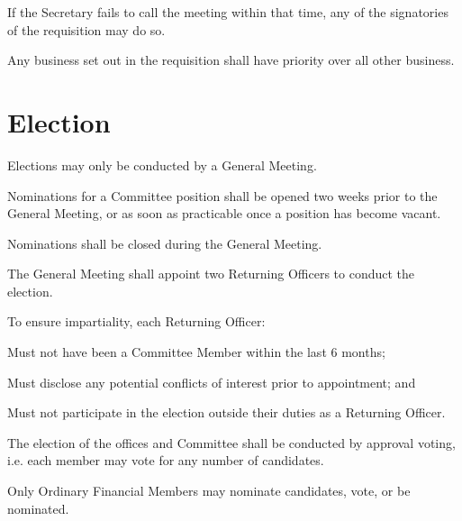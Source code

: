 \documentclass[a4paper]{article}
\begin{document}
\begin{myEnumerate}
\begin{myEnumerate}
            \begin{myEnumerate}
                \item If the Secretary fails to call the meeting within that time, any of the signatories of the requisition may do so.
            \end{myEnumerate}
            \item \label{item:sgm_priority} Any business set out in the requisition shall have priority over all other business.
        \end{myEnumerate}
\end{myEnumerate}


\section{Election} \label{sec:elections}
\begin{myEnumerate}
    \item Elections may only be conducted by a General Meeting.
    \item Nominations for a Committee position shall be opened two weeks prior to the General Meeting, or as soon as practicable once a position has become vacant.
    \item Nominations shall be closed during the General Meeting.
    \item The General Meeting shall appoint two Returning Officers to conduct the election.
    \begin{myEnumerate}
        \item To ensure impartiality, each Returning Officer:
        \begin{myEnumerate}
            \item Must not have been a Committee Member within the last 6 months;
            \item Must disclose any potential conflicts of interest prior to appointment; and
            \item Must not participate in the election outside their duties as a Returning Officer.
        \end{myEnumerate}
    \end{myEnumerate}
    \item The election of the offices and Committee shall be conducted by approval voting, i.e. each member may vote for any number of candidates.
    \item Only Ordinary Financial Members may nominate candidates, vote, or be nominated.
        \begin{myEnumerate}

\end{myEnumerate}
\end{myEnumerate}
\end{document}
